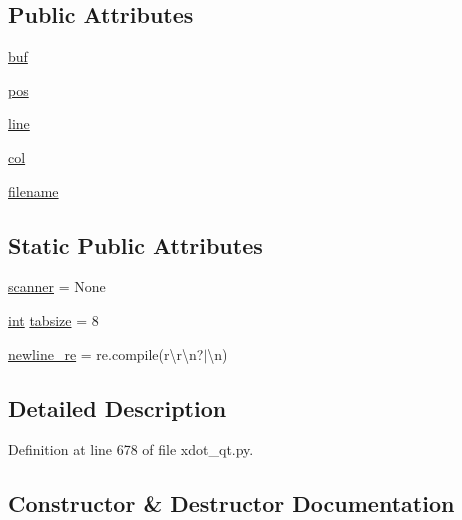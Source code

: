\subsection*{Public Attributes}
\begin{DoxyCompactItemize}
\item 
\hyperlink{classsmacc__viewer_1_1xdot_1_1xdot__qt_1_1Lexer_a84972711cf93f6cb82650f9f268198bf}{buf}
\item 
\hyperlink{classsmacc__viewer_1_1xdot_1_1xdot__qt_1_1Lexer_a091be9759b62e2a485ea9538b429b453}{pos}
\item 
\hyperlink{classsmacc__viewer_1_1xdot_1_1xdot__qt_1_1Lexer_a52906deed94ab0734201e50faf6f3c7f}{line}
\item 
\hyperlink{classsmacc__viewer_1_1xdot_1_1xdot__qt_1_1Lexer_af2614106d71cab740cc0e1e1e6e349c0}{col}
\item 
\hyperlink{classsmacc__viewer_1_1xdot_1_1xdot__qt_1_1Lexer_a568d66f9f2bcbf00150f2ad4889295da}{filename}
\end{DoxyCompactItemize}
\subsection*{Static Public Attributes}
\begin{DoxyCompactItemize}
\item 
\hyperlink{classsmacc__viewer_1_1xdot_1_1xdot__qt_1_1Lexer_aed8e203ba6a6926aeaaec5169b14be4a}{scanner} = None
\item 
\hyperlink{classint}{int} \hyperlink{classsmacc__viewer_1_1xdot_1_1xdot__qt_1_1Lexer_a512bd6b3cb3ddefd1776ef45e247ea4b}{tabsize} = 8
\item 
\hyperlink{classsmacc__viewer_1_1xdot_1_1xdot__qt_1_1Lexer_a1692a3d1570e72a945946242edd0f7e9}{newline\+\_\+re} = re.\+compile(r\textquotesingle{}\textbackslash{}r\textbackslash{}n?$\vert$\textbackslash{}n\textquotesingle{})
\end{DoxyCompactItemize}


\subsection{Detailed Description}


Definition at line 678 of file xdot\+\_\+qt.\+py.



\subsection{Constructor \& Destructor Documentation}
